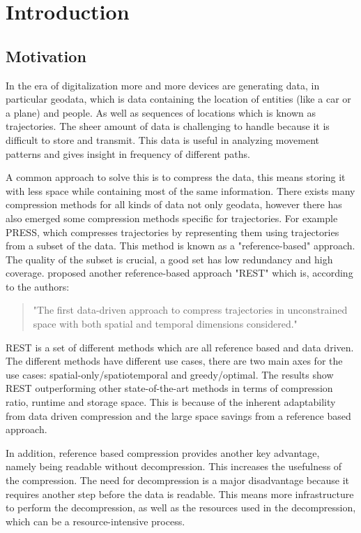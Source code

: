 \chapter{Introduction}
\section{Motivation}

In the era of digitalization more and more devices are generating data, in particular geodata, which is data containing the location of entities (like a car or a plane) and people. As well as sequences of locations which is known as trajectories. The sheer amount of data is challenging to handle because it is difficult to store and transmit. This data is useful in analyzing movement patterns and gives insight in frequency of different paths.

A common approach to solve this is to compress the data, this means storing it with less space while containing most of the same information. There exists many compression methods for all kinds of data not only geodata, however there has also emerged some compression methods specific for trajectories. For example PRESS, which compresses trajectories by representing them using trajectories from a subset of the data. This method is known as a "reference-based" approach. The quality of the subset is crucial, a good set has low redundancy and high coverage. \textcite{zhao2018rest} proposed another reference-based approach "REST" which is, according to the authors:
\begin{quote}
    "The first data-driven approach to compress trajectories in unconstrained space with both spatial and temporal dimensions considered."
\end{quote}
REST is a set of different methods which are all reference based and data driven. The different methods have different use cases, there are two main axes for the use cases: spatial-only/spatiotemporal and greedy/optimal. The results show REST outperforming other state-of-the-art methods in terms of compression ratio, runtime and storage space. This is because of the inherent adaptability from data driven compression and the large space savings from a reference based approach.

In addition, reference based compression provides another key advantage, \\ namely being readable without decompression. This increases the usefulness of the compression. The need for decompression is a major disadvantage because it requires another step before the data is readable. This means more infrastructure to perform the decompression, as well as the resources used in the decompression, which can be a resource-intensive process.

